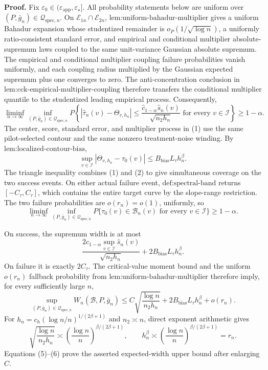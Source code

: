 \textbf{Proof.}
Fix \(\varepsilon_0\in(\varepsilon_{\mathrm{app}},\varepsilon_\star]\).  All probability statements below are uniform over \((P,\bar g_n)\in\mathcal Q_{\mathrm{spec},n}\).  On \(\mathcal E_{1n}\cap\mathcal E_{2n}\), \(\text{lem:uniform-bahadur-multiplier}\) gives a uniform Bahadur expansion whose studentized remainder is \(o_P(1/\sqrt{\log n})\), a uniformly ratio-consistent standard error, and empirical and conditional multiplier absolute-supremum laws coupled to the same unit-variance Gaussian absolute supremum.  The empirical and conditional multiplier coupling failure probabilities vanish uniformly, and each coupling radius multiplied by the Gaussian expected supremum plus one converges to zero.  The anti-concentration conclusion in \(\text{lem:cck-empirical-multiplier-coupling}\) therefore transfers the conditional multiplier quantile to the studentized leading empirical process.  Consequently,
\[
 \liminf_{n\to\infty}\inf_{(P,\bar g_n)\in\mathcal Q_{\mathrm{spec},n}}
 P\left\{
 |\widehat\tau_n(v)-\Theta_{v,h_n}|
 \le\frac{\widehat c_{1-\alpha}\widehat s_n(v)}{\sqrt{n_2h_n}}
 \text{ for every }v\in\mathcal I
 \right\}\ge1-\alpha. \tag{1}
\]
The center, score, standard error, and multiplier process in (1) use the same pilot-selected contour and the same nonzero treatment-noise winding.  By \(\text{lem:localized-contour-bias}\),
\[
 \sup_{v\in\mathcal I}|\Theta_{v,h_n}-\tau_0(v)|
 \le B_{\mathrm{bias}}L_\tau h_n^\beta. \tag{2}
\]
The triangle inequality combines (1) and (2) to give simultaneous coverage on the two success events.  On either actual failure event, \(\text{def:spectral-band}\) returns \([-C_\tau,C_\tau]\), which contains the entire target curve by the slope-range restriction.  The two failure probabilities are \(o(r_n)=o(1)\), uniformly, so
\[
 \liminf_{n\to\infty}\inf_{(P,\bar g_n)\in\mathcal Q_{\mathrm{spec},n}}
 P\{\tau_0(v)\in\mathcal B_n(v)\text{ for every }v\in\mathcal I\}
 \ge1-\alpha. \tag{3}
\]

On success, the supremum width is at most
\[
 \frac{2\widehat c_{1-\alpha}\sup_{v\in\mathcal I}\widehat s_n(v)}
 {\sqrt{n_2h_n}}
 +2B_{\mathrm{bias}}L_\tau h_n^\beta. \tag{4}
\]
On failure it is exactly \(2C_\tau\).  The critical-value moment bound and the uniform \(o(r_n)\) fallback probability from \(\text{lem:uniform-bahadur-multiplier}\) therefore imply, for every sufficiently large \(n\),
\[
 \sup_{(P,\bar g_n)\in\mathcal Q_{\mathrm{spec},n}}
 W_n(\mathcal B,P,\bar g_n)
 \le C\sqrt{\frac{\log n}{n_2h_n}}
 +2B_{\mathrm{bias}}L_\tau h_n^\beta+o(r_n). \tag{5}
\]
For \(h_n=c_h(\log n/n)^{1/(2\beta+1)}\) and \(n_2\asymp n\), direct exponent arithmetic gives
\[
 \sqrt{\frac{\log n}{n_2h_n}}
 \asymp
 \left(\frac{\log n}{n}\right)^{\beta/(2\beta+1)},
 \qquad
 h_n^\beta
 \asymp
 \left(\frac{\log n}{n}\right)^{\beta/(2\beta+1)}
 =r_n. \tag{6}
\]
Equations (5)--(6) prove the asserted expected-width upper bound after enlarging \(C\).


